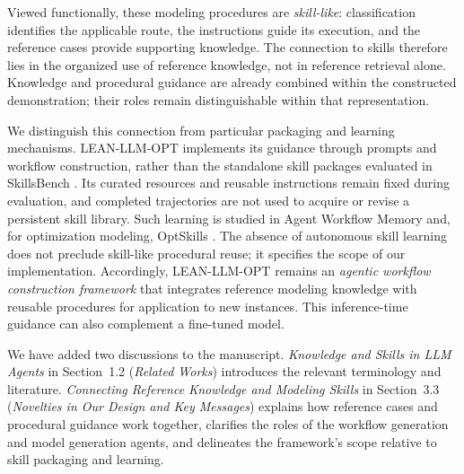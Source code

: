 {Viewed functionally, these modeling procedures are \emph{skill-like}: classification identifies the applicable route, the instructions guide its execution, and the reference cases provide supporting knowledge. The connection to skills therefore lies in the organized use of reference knowledge, not in reference retrieval alone. Knowledge and procedural guidance are already combined within the constructed demonstration; their roles remain distinguishable within that representation.

We distinguish this connection from particular packaging and learning mechanisms. LEAN-LLM-OPT implements its guidance through prompts and workflow construction, rather than the standalone skill packages evaluated in SkillsBench \citep{ae1_li2026skillsbench}. Its curated resources and reusable instructions remain fixed during evaluation, and completed trajectories are not used to acquire or revise a persistent skill library. Such learning is studied in Agent Workflow Memory \citep{ae1_wang2025awm} and, for optimization modeling, OptSkills \citep{ae1_yang2026optskills}. The absence of autonomous skill learning does not preclude skill-like procedural reuse; it specifies the scope of our implementation. Accordingly, LEAN-LLM-OPT remains an \emph{agentic workflow construction framework} that integrates reference modeling knowledge with reusable procedures for application to new instances. This inference-time guidance can also complement a fine-tuned model.

We have added two discussions to the manuscript. \emph{Knowledge and Skills in LLM Agents} in Section~1.2 (\emph{Related Works}) introduces the relevant terminology and literature. \emph{Connecting Reference Knowledge and Modeling Skills} in Section~3.3 (\emph{Novelties in Our Design and Key Messages}) explains how reference cases and procedural guidance work together, clarifies the roles of the workflow generation and model generation agents, and delineates the framework's scope relative to skill packaging and learning.
}
